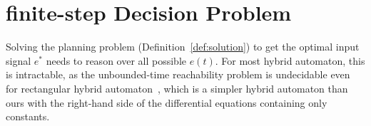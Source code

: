 \documentclass[sigconf]{acmart}
\begin{document}


\section{finite-step Decision Problem}\label{section:fixed}

Solving the planning problem (Definition~\ref{def:solution}) to get the optimal input signal $e^*$ needs to reason over all possible $e(t)$. For most hybrid automaton, this is intractable, as the unbounded-time reachability problem is undecidable even for rectangular hybrid automaton~\cite{henzinger1998s}, which is a simpler hybrid automaton than ours with the right-hand side of the differential equations containing only constants. 
\end{document}
